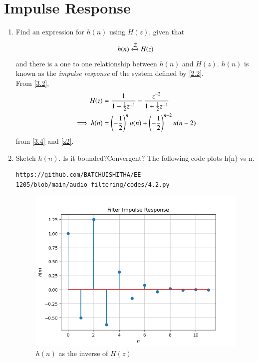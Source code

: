 \documentclass[journal,12pt,twocolumn]{IEEEtran}
\newcommand{\systemZ}[1]{\stackrel{#1}{\mathcal{Z}}}
\theoremstyle{remark}
\begin{document}
\section{Impulse Response}
\begin{enumerate}[label=\thesection.\arabic*]
\item \label{prob:impulse_resp}
Find an expression for $h(n)$ using $H(z)$, given that 
\begin{equation}
h(n) \xleftrightarrow{\systemZ{}} H(z)  \label{4.1}
\end{equation}
and there is a one to one relationship between $h(n)$ and $H(z)$. $h(n)$ is known as the {\em impulse response} of the
system defined by \eqref{2.2}.\\
\solution From \eqref{3.2},
\begin{align}
H(z) &= \frac{1}{1 + \frac{1}{2}z^{-1}} + \frac{ z^{-2}}{1 + \frac{1}{2}z^{-1}}
\\
\implies h(n) &= \left(-\frac{1}{2}\right)^{n}u(n) + \left(-\frac{1}{2}\right)^{n-2}u(n-2)
\end{align}
from \eqref{3.4} and \eqref{z2}.
\item Sketch $h(n)$. Is it bounded?Convergent?
The following code plots h(n) vs n.
\begin{lstlisting}
https://github.com/BATCHUISHITHA/EE-1205/blob/main/audio_filtering/codes/4.2.py
\end{lstlisting}
\begin{figure}[ht]
	\centering
	\includegraphics[width=\columnwidth]{figs/4.2.png}
	\caption{$h(n)$ as the inverse of $H(z)$}
	\label{fig:4.2}
\end{figure}

\end{enumerate}
\end{document}
